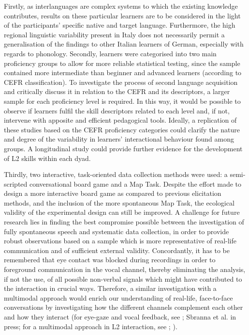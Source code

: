 \begin{stylecaption}
\textup{Firstly, as interlanguages are complex systems to which the existing knowledge contributes, results on these particular learners are to be considered in the light of the participants’ specific native and target language. Furthermore, the high regional linguistic variability present in Italy does not necessarily permit a generalisation of the findings to other Italian learners of German, especially with regards to phonology. Secondly, learners were categorised into two main proficiency groups to allow for more reliable statistical testing, since the sample contained more intermediate than beginner and advanced learners (according to CEFR classification). To investigate the process of second language acquisition and critically discuss it in relation to the CEFR and its descriptors, a larger sample for each proficiency level is required. In this way, it would be possible to observe if learners fulfil the skill descriptors related to each level and, if not, intervene with apposite and efficient pedagogical tools. Ideally, a replication of these studies based on the CEFR proficiency categories could clarify the nature and degree of the variability in learners’ interactional behaviour found among groups. A longitudinal study could provide further evidence for the development of L2 skills within each dyad.}
\end{stylecaption}

\begin{stylecaption}
\textup{Thirdly, two interactive, task-oriented data collection methods were used: a semi-scripted conversational board game and a Map Task. Despite the effort made to design a more interactive board game as compared to previous elicitation methods, and the inclusion of the more spontaneous Map Task, the ecological validity of the experimental design can still be improved. A challenge for future research lies in finding the best compromise possible between the investigation of fully spontaneous speech and systematic data collection, in order to provide robust observations based on a sample which is more representative of real-life communication and of sufficient external validity.} \textup{Concordantly, it has to be remembered that eye contact was blocked during recordings in order to foreground communication in the vocal channel, thereby eliminating the analysis, if not the use, of all possible non-verbal signals which might have contributed to the interaction in crucial ways. Therefore, a similar investigation with a multimodal approach would enrich our understanding of real-life, face-to-face conversations by investigating how the different channels complement each other and how they interact} \textup{(for eye-gaze and vocal feedback, see \citealt{SpaniolEtAl2023}; Sbranna et al. in press; for a multimodal approach in L2 interaction, see \citealt{TsunemotoEtAl2022}; \citealt{McDonoughEtAl2020})}.
\end{stylecaption}

